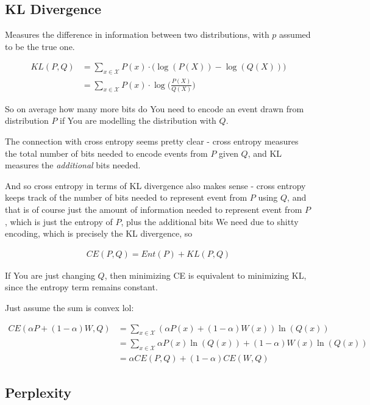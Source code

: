 \documentclass{article}
\begin{document}
	\subsection{KL Divergence}
	
		Measures the difference in information between two distributions, with $p$ assumed to be the true one.
		
		\begin{align}
			KL(P, Q) &= \sum_{x\in\mathcal{X}} P(x)\cdot\big(\log(P(X)) - \log(Q(X)) \big)\\
			&= \sum_{x\in\mathcal{X}} P(x)\cdot\log\bigg(\frac{P(X)}{Q(X)}\bigg)
		\end{align}
		
		So on average how many more bits do You need to encode an event drawn from distribution $P$ if You are modelling the distribution with $Q$.
		
		The connection with cross entropy seems pretty clear - cross entropy measures the total number of bits needed to encode events from $P$ given $Q$, and KL measures the \textit{additional} bits needed.
		
		And so cross entropy in terms of KL divergence also makes sense - cross entropy keeps track of the number of bits needed to represent event from $P$ using $Q$, and that is of course just the amount of information needed to represent event from $P$, which is just the entropy of $P$, plus the additional bits We need due to shitty encoding, which is precisely the KL divergence, so
		
		\begin{align}
			CE(P, Q) = Ent(P) + KL(P, Q)
		\end{align}
		
		If You are just changing $Q$, then minimizing CE is equivalent to minimizing KL, since the entropy term remains constant. 
		
		Just assume the sum is convex lol:
				
		\begin{align}
			CE(\alpha P+(1-\alpha)W, Q) &= \sum_{x\in\mathcal{X}} (\alpha P(x)+(1-\alpha)W(x))\ln(Q(x))\\
			&= \sum_{x\in\mathcal{X}} \alpha P(x)\ln(Q(x)) +(1-\alpha)W(x)\ln(Q(x))\\
			&= \alpha CE(P, Q) + (1-\alpha)CE(W, Q)
		\end{align}
		
	\subsection{Perplexity}
	
\end{document}
